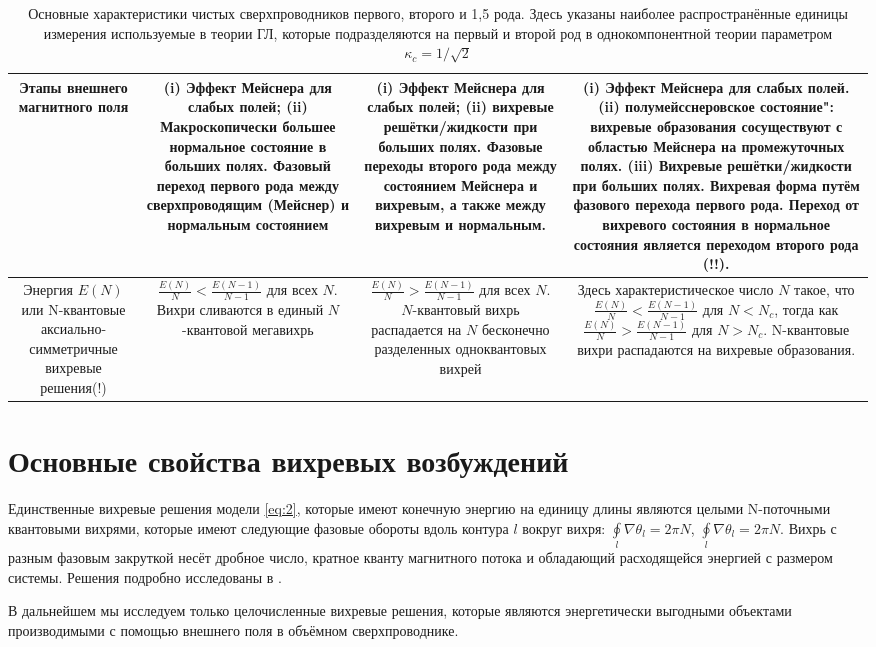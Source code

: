 \begin{table}[ht]
\begin{tabular}{|C{.18}|C{.22}|C{.22}|C{.35}|}
        Этапы внешнего магнитного поля & (i) Эффект Мейснера для слабых полей; 
            (ii) Макроскопически большее нормальное состояние в больших полях. 
            Фазовый переход первого рода между сверхпроводящим (Мейснер) и 
            нормальным состоянием & (i) Эффект Мейснера для слабых полей; (ii) 
            вихревые решётки/жидкости при больших полях. Фазовые переходы 
            второго рода между состоянием Мейснера и вихревым, а также 
            между вихревым и нормальным. & (i) Эффект Мейснера для слабых 
            полей. (ii) полумейсснеровское состояние": вихревые образования 
            сосуществуют с областью Мейснера на промежуточных полях. (iii) 
            Вихревые решётки/жидкости при больших полях. Вихревая форма путём 
            фазового перехода первого рода. Переход от вихревого состояния в 
            нормальное состояния является переходом второго рода (!!).
        \\ \hline

        Энергия \( E(N) \) или N-квантовые аксиально-симметричные вихревые 
            решения(!) & \( \frac{E(N)}{N} < \frac{E(N-1)}{N-1} \) для всех 
            \( N \). Вихри сливаются в единый \( N \)-квантовой мегавихрь &
        \( \frac{E(N)}{N} > \frac{E(N-1)}{N-1} \) для всех \( N \). 
            \( N \)-квантовый вихрь распадается на \( N \) бесконечно 
            разделенных одноквантовых вихрей & Здесь характеристическое число 
            \( N \) такое, что \( \frac{E(N)}{N} < \frac{E(N-1)}{N-1} \) для 
            \( N < N_c \), тогда как 
            \( \frac{E(N)}{N} > \frac{E(N-1)}{N-1} \) для \( N > N_c \). 
            N-квантовые вихри распадаются на вихревые образования.
        \\ \hline

    \end{tabular}
    \caption{Основные характеристики чистых сверхпроводников первого, второго и 
        1,5 рода. Здесь указаны наиболее распространённые единицы измерения 
        используемые в теории ГЛ, которые подразделяются на первый и второй 
        род в однокомпонентной теории параметром \( \kappa_c = 1/\sqrt{2} \)}
\end{table}

\section{Основные свойства вихревых возбуждений}
\label{sec:2-2}

Единственные вихревые решения модели \eqref{eq:2}, которые имеют конечную 
энергию на единицу длины являются целыми N-поточными квантовыми вихрями, 
которые имеют следующие фазовые обороты вдоль контура \( l \) вокруг вихря: 
\( \oint\limits_l \nabla\theta_l = 2\pi N \), 
\( \oint\limits_l \nabla\theta_l = 2\pi N \). Вихрь с разным фазовым закруткой 
несёт дробное число, кратное кванту магнитного потока и обладающий
расходящейся энергией с размером системы. Решения подробно исследованы в
\cite{bib:22}.

В дальнейшем мы исследуем только целочисленные вихревые решения, которые 
являются энергетически выгодными объектами производимыми с помощью внешнего 
поля в объёмном сверхпроводнике.